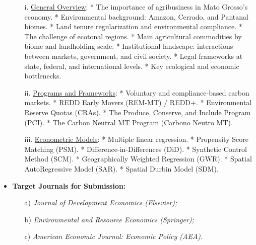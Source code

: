 \begin{itemize}
    \begin{itemize}
      \item[i.] \underline{General Overview}: * The importance of agribusiness in Mato Grosso’s economy. * Environmental background: Amazon, Cerrado, and Pantanal biomes. * Land tenure regularization and environmental compliance. * The challenge of ecotonal regions. * Main agricultural commodities by biome and landholding scale. * Institutional landscape: interactions between markets, government, and civil society. * Legal frameworks at state, federal, and international levels. * Key ecological and economic bottlenecks.

      \item[ii.] \underline{Programs and Frameworks}: * Voluntary and compliance-based carbon markets. * REDD Early Movers (REM-MT) / REDD+. * Environmental Reserve Quotas (CRAs). * The Produce, Conserve, and Include Program (PCI). * The Carbon Neutral MT Program (Carbono Neutro MT).

      \item[iii.] \underline{Econometric Models}: * Multiple linear regression. * Propensity Score Matching (PSM). * Difference-in-Differences (DiD). * Synthetic Control Method (SCM). * Geographically Weighted Regression (GWR). * Spatial AutoRegressive Model (SAR). * Spatial Durbin Model (SDM).
    \end{itemize}

  \item \textbf{Target Journals for Submission:}
    \begin{itemize}
      \item[a)] \textit{Journal of Development Economics (Elsevier);}
      \item[b)] \textit{Environmental and Resource Economics (Springer);}
      \item[c)] \textit{American Economic Journal: Economic Policy (AEA).}
    \end{itemize}
\end{itemize}

\newpage

